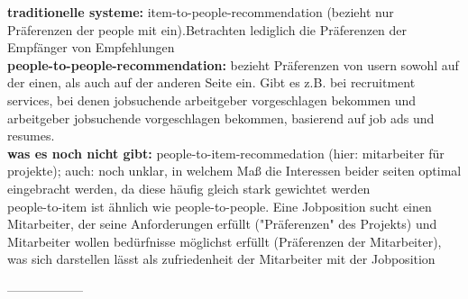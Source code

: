 \textbf{traditionelle systeme:} item-to-people-recommendation (bezieht nur Präferenzen der people mit ein).Betrachten lediglich die Präferenzen der Empfänger von Empfehlungen \\ %
\textbf{people-to-people-recommendation:} bezieht Präferenzen von usern sowohl auf der einen, als auch auf der anderen Seite ein. Gibt es z.B. bei recruitment services, bei denen jobsuchende arbeitgeber vorgeschlagen bekommen und arbeitgeber jobsuchende vorgeschlagen bekommen, basierend auf job ads und resumes.\\ %
\textbf{was es noch nicht gibt:} people-to-item-recommedation (hier: mitarbeiter für projekte); auch: noch unklar, in welchem Maß die Interessen beider seiten optimal eingebracht werden, da diese häufig gleich stark gewichtet werden\\ %
people-to-item ist ähnlich wie people-to-people. Eine Jobposition sucht einen Mitarbeiter, der seine Anforderungen erfüllt ("Präferenzen" des Projekts) und Mitarbeiter wollen bedürfnisse möglichst erfüllt (Präferenzen der Mitarbeiter), was sich darstellen lässt als zufriedenheit der Mitarbeiter mit der Jobposition

------------------


